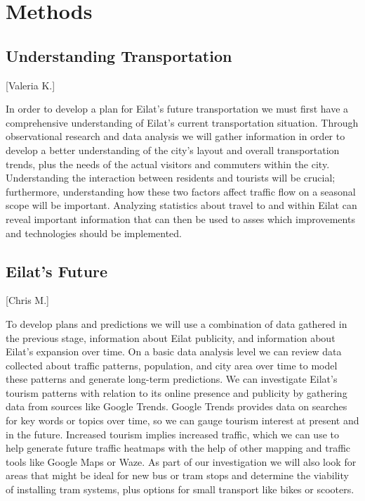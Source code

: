 \documentclass[12pt]{article}                         %
\begin{document}
\newpage
\section{Methods}

\subsection{Understanding Transportation}[Valeria K.]

In order to develop a plan for Eilat's future transportation we must first have a comprehensive understanding of Eilat's current transportation situation. Through observational research and data analysis we will gather information in order to develop a better understanding of the city's layout and overall transportation trends, plus the needs of the actual visitors and commuters within the city. Understanding the interaction between residents and tourists will be crucial; furthermore, understanding how these two factors affect traffic flow on a seasonal scope will be important. Analyzing statistics about travel to and within Eilat can reveal important information that can then be used to asses which improvements and technologies should be implemented.

\subsection{Eilat's Future}[Chris M.]

To develop plans and predictions we will use a combination of data gathered in the previous stage, information about Eilat publicity, and information about Eilat's expansion over time. On a basic data analysis level we can review data collected about traffic patterns, population, and city area over time to model these patterns and generate long-term predictions. We can investigate Eilat's tourism patterns with relation to its online presence and publicity by gathering data from sources like Google Trends. Google Trends provides data on searches for key words or topics over time, so we can gauge tourism interest at present and in the future. Increased tourism implies increased traffic, which we can use to help generate future traffic heatmaps with the help of other mapping and traffic tools like Google Maps or Waze. As part of our investigation we will also look for areas that might be ideal for new bus or tram stops and determine the viability of installing tram systems, plus options for small transport like bikes or scooters.
\end{document}
